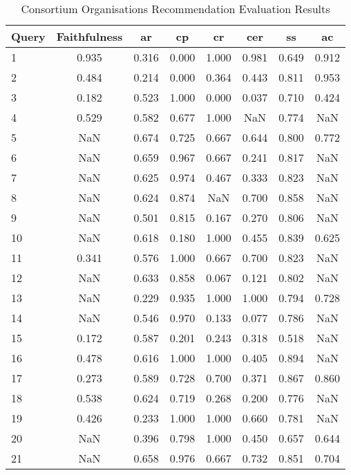 \begin{table}[htbp]
    \centering
    \begin{tabularx}{\textwidth}{|X|c|c|c|c|c|c|c|}
      \hline
      \textbf{Query} & \textbf{Faithfulness} & \textbf{\gls{ar}} & \textbf{\gls{cp}} & \textbf{\gls{cr}} & \textbf{\gls{cer}} & \textbf{\gls{ss}} & \textbf{\gls{ac}} \\
      \hline
        1 & 0.935 & 0.316 & 0.000 & 1.000 & 0.981 & 0.649 & 0.912 \\
        \hline
        2 & 0.484 & 0.214 & 0.000 & 0.364 & 0.443 & 0.811 & 0.953 \\
        \hline
        3 & 0.182 & 0.523 & 1.000 & 0.000 & 0.037 & 0.710 & 0.424 \\
        \hline
        4 & 0.529 & 0.582 & 0.677 & 1.000 & NaN & 0.774 & NaN \\
        \hline
        5 & NaN & 0.674 & 0.725 & 0.667 & 0.644 & 0.800 & 0.772 \\
        \hline
        6 & NaN & 0.659 & 0.967 & 0.667 & 0.241 & 0.817 & NaN \\
        \hline
        7 & NaN & 0.625 & 0.974 & 0.467 & 0.333 & 0.823 & NaN \\
        \hline
        8 & NaN & 0.624 & 0.874 & NaN & 0.700 & 0.858 & NaN \\
        \hline
        9 & NaN & 0.501 & 0.815 & 0.167 & 0.270 & 0.806 & NaN \\
        \hline
        10 & NaN & 0.618 & 0.180 & 1.000 & 0.455 & 0.839 & 0.625 \\
        \hline
        11 & 0.341 & 0.576 & 1.000 & 0.667 & 0.700 & 0.823 & NaN \\
        \hline
        12 & NaN & 0.633 & 0.858 & 0.067 & 0.121 & 0.802 & NaN \\
        \hline
        13 & NaN & 0.229 & 0.935 & 1.000 & 1.000 & 0.794 & 0.728 \\
        \hline
        14 & NaN & 0.546 & 0.970 & 0.133 & 0.077 & 0.786 & NaN \\
        \hline
        15 & 0.172 & 0.587 & 0.201 & 0.243 & 0.318 & 0.518 & NaN \\
        \hline
        16 & 0.478 & 0.616 & 1.000 & 1.000 & 0.405 & 0.894 & NaN \\
        \hline
        17 & 0.273 & 0.589 & 0.728 & 0.700 & 0.371 & 0.867 & 0.860 \\
        \hline
        18 & 0.538 & 0.624 & 0.719 & 0.268 & 0.200 & 0.776 & NaN \\
        \hline
        19 & 0.426 & 0.233 & 1.000 & 1.000 & 0.660 & 0.781 & NaN \\
        \hline
        20 & NaN & 0.396 & 0.798 & 1.000 & 0.450 & 0.657 & 0.644 \\
        \hline
        21 & NaN & 0.658 & 0.976 & 0.667 & 0.732 & 0.851 & 0.704 \\
        \hline
    \end{tabularx}
    \caption{Consortium Organisations Recommendation Evaluation Results}
    \label{table:consortium-organisations-recommendation-evaluation-results}
\end{table}

